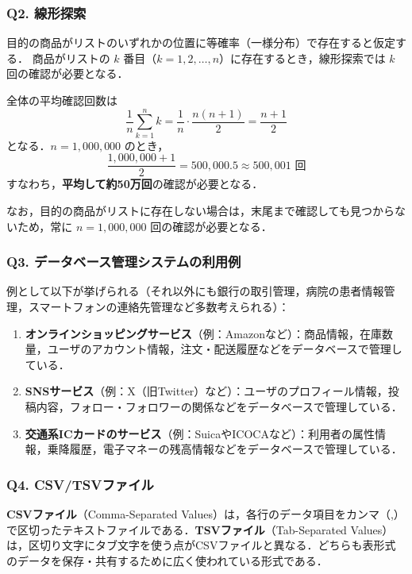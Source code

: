 \subsubsection*{Q2. 線形探索}
目的の商品がリストのいずれかの位置に等確率（一様分布）で存在すると仮定する．
商品がリストの $k$ 番目（$k = 1, 2, \ldots, n$）に存在するとき，線形探索では $k$ 回の確認が必要となる．

全体の平均確認回数は
\begin{equation}
\frac{1}{n} \sum_{k=1}^{n} k = \frac{1}{n} \cdot \frac{n(n+1)}{2} = \frac{n+1}{2}
\end{equation}
となる．$n = 1{,}000{,}000$ のとき，
\begin{equation}
\frac{1{,}000{,}000 + 1}{2} = 500{,}000.5 \approx 500{,}001 \text{ 回}
\end{equation}
すなわち，\textbf{平均して約50万回}の確認が必要となる．

なお，目的の商品がリストに存在しない場合は，末尾まで確認しても見つからないため，常に $n = 1{,}000{,}000$ 回の確認が必要となる．

\subsubsection*{Q3. データベース管理システムの利用例}
例として以下が挙げられる（それ以外にも銀行の取引管理，病院の患者情報管理，スマートフォンの連絡先管理など多数考えられる）：
\begin{enumerate}
    \item \textbf{オンラインショッピングサービス}（例：Amazonなど）：商品情報，在庫数量，ユーザのアカウント情報，注文・配送履歴などをデータベースで管理している．
    \item \textbf{SNSサービス}（例：X（旧Twitter）など）：ユーザのプロフィール情報，投稿内容，フォロー・フォロワーの関係などをデータベースで管理している．
    \item \textbf{交通系ICカードのサービス}（例：SuicaやICOCAなど）：利用者の属性情報，乗降履歴，電子マネーの残高情報などをデータベースで管理している．
\end{enumerate}

\subsubsection*{Q4. CSV/TSVファイル}
\textbf{CSVファイル}（Comma-Separated Values）は，各行のデータ項目をカンマ（,）で区切ったテキストファイルである．\textbf{TSVファイル}（Tab-Separated Values）は，区切り文字にタブ文字を使う点がCSVファイルと異なる．どちらも表形式のデータを保存・共有するために広く使われている形式である．

